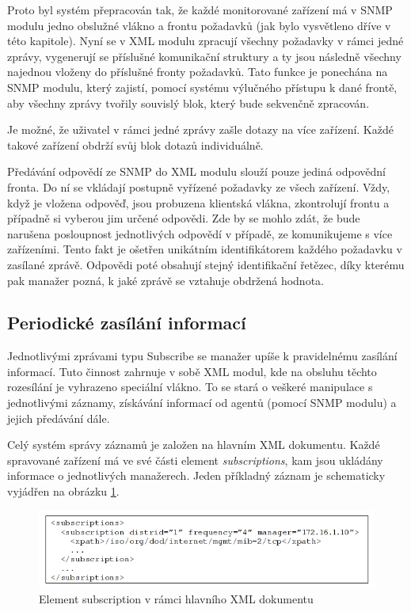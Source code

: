 Proto byl systém přepracován tak, že každé monitorované zařízení má v SNMP modulu jedno obslužné vlákno a frontu požadavků (jak bylo vysvětleno 
dříve v této kapitole). Nyní se v XML modulu zpracují všechny požadavky v rámci jedné zprávy, vygenerují se příslušné komunikační struktury a ty jsou
následně všechny najednou vloženy do příslušné fronty požadavků. Tato funkce je ponechána na SNMP modulu, který zajistí, pomocí systému výlučného přístupu
k dané frontě, aby všechny zprávy tvořily souvislý blok, který bude sekvenčně zpracován.

Je možné, že uživatel v rámci jedné zprávy zašle dotazy na více zařízení. Každé takové zařízení obdrží svůj blok dotazů individuálně.

Předávání odpovědí ze SNMP do XML modulu slouží pouze jediná odpovědní fronta. Do ní se vkládají postupně vyřízené požadavky ze všech zařízení.
Vždy, když je vložena odpověď, jsou probuzena klientská vlákna, zkontrolují frontu a případně si vyberou jim určené odpovědi. Zde by se mohlo zdát,
že bude narušena posloupnost jednotlivých odpovědí v případě, ze komunikujeme s více zařízeními. Tento fakt je ošetřen unikátním identifikátorem každého
požadavku v zasílané zprávě. Odpovědi poté obsahují stejný identifikační řetězec, díky kterému pak manažer pozná, k jaké zprávě se vztahuje obdržená hodnota.

\subsection{Periodické zasílání informací}
Jednotlivými zprávami typu Subscribe se manažer upíše k pravidelnému zasílání informací. Tuto činnost zahrnuje v sobě XML modul, kde na obsluhu těchto
rozesílání je vyhrazeno speciální vlákno. To se stará o veškeré manipulace s jednotlivými záznamy, získávání informací od agentů (pomocí SNMP modulu) a jejich
předávání dále.

Celý systém správy záznamů je založen na hlavním XML dokumentu. Každé spravované zařízení má ve své části element \textit{subscriptions}, kam jsou ukládány
informace o jednotlivých manažerech. Jeden příkladný záznam je schematicky vyjádřen na obrázku \ref{obr_impl_subscript_element}.
\begin{figure}[htp]
	\begin{center}
		\includegraphics[width=14cm]{obrazky/05_subscr_element.png}
		\caption{Element subscription v rámci hlavního XML dokumentu}
		\label{obr_impl_subscript_element}
	\end{center}
\end{figure}

